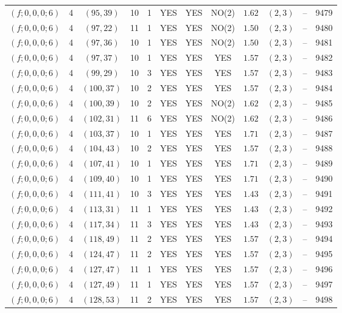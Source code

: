 \begin{longtable}{|c|c|c|c|c|c|c|c|c|c|c|c|}
$(f;0,0,0;6)$ & 4 & $(95,39)$ & 10 & 1 & YES & YES & NO(2) & $1.62$ & $(2,3)$ & -- & 9479\\
$(f;0,0,0;6)$ & 4 & $(97,22)$ & 11 & 1 & YES & YES & NO(2) & $1.50$ & $(2,3)$ & -- & 9480\\
$(f;0,0,0;6)$ & 4 & $(97,36)$ & 10 & 1 & YES & YES & NO(2) & $1.50$ & $(2,3)$ & -- & 9481\\
$(f;0,0,0;6)$ & 4 & $(97,37)$ & 10 & 1 & YES & YES & YES & $1.57$ & $(2,3)$ & -- & 9482\\
$(f;0,0,0;6)$ & 4 & $(99,29)$ & 10 & 3 & YES & YES & YES & $1.57$ & $(2,3)$ & -- & 9483\\
$(f;0,0,0;6)$ & 4 & $(100,37)$ & 10 & 2 & YES & YES & YES & $1.57$ & $(2,3)$ & -- & 9484\\
$(f;0,0,0;6)$ & 4 & $(100,39)$ & 10 & 2 & YES & YES & NO(2) & $1.62$ & $(2,3)$ & -- & 9485\\
$(f;0,0,0;6)$ & 4 & $(102,31)$ & 11 & 6 & YES & YES & NO(2) & $1.62$ & $(2,3)$ & -- & 9486\\
$(f;0,0,0;6)$ & 4 & $(103,37)$ & 10 & 1 & YES & YES & YES & $1.71$ & $(2,3)$ & -- & 9487\\
$(f;0,0,0;6)$ & 4 & $(104,43)$ & 10 & 2 & YES & YES & YES & $1.57$ & $(2,3)$ & -- & 9488\\
$(f;0,0,0;6)$ & 4 & $(107,41)$ & 10 & 1 & YES & YES & YES & $1.71$ & $(2,3)$ & -- & 9489\\
$(f;0,0,0;6)$ & 4 & $(109,40)$ & 10 & 1 & YES & YES & YES & $1.71$ & $(2,3)$ & -- & 9490\\
$(f;0,0,0;6)$ & 4 & $(111,41)$ & 10 & 3 & YES & YES & YES & $1.43$ & $(2,3)$ & -- & 9491\\
$(f;0,0,0;6)$ & 4 & $(113,31)$ & 11 & 1 & YES & YES & YES & $1.43$ & $(2,3)$ & -- & 9492\\
$(f;0,0,0;6)$ & 4 & $(117,34)$ & 11 & 3 & YES & YES & YES & $1.43$ & $(2,3)$ & -- & 9493\\
$(f;0,0,0;6)$ & 4 & $(118,49)$ & 11 & 2 & YES & YES & YES & $1.57$ & $(2,3)$ & -- & 9494\\
$(f;0,0,0;6)$ & 4 & $(124,47)$ & 11 & 2 & YES & YES & YES & $1.57$ & $(2,3)$ & -- & 9495\\
$(f;0,0,0;6)$ & 4 & $(127,47)$ & 11 & 1 & YES & YES & YES & $1.57$ & $(2,3)$ & -- & 9496\\
$(f;0,0,0;6)$ & 4 & $(127,49)$ & 11 & 1 & YES & YES & YES & $1.57$ & $(2,3)$ & -- & 9497\\
$(f;0,0,0;6)$ & 4 & $(128,53)$ & 11 & 2 & YES & YES & YES & $1.57$ & $(2,3)$ & -- & 9498\\

\end{longtable}
